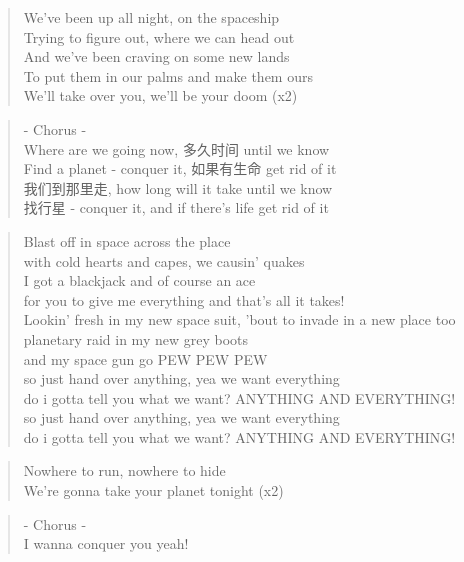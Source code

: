 {}
\begin{verse}
We've been up all night, on the spaceship\\
Trying to figure out, where we can head out\\
And we've been craving on some new lands\\
To put them in our palms and make them ours\\
We'll take over you, we'll be your doom (x2)
\end{verse}

\begin{verse}
- Chorus -\\
Where are we going now, 多久时间 until we know\\
Find a planet - conquer it, 如果有生命 get rid of it\\
我们到那里走, how long will it take until we know\\
找行星 - conquer it, and if there's life get rid of it
\end{verse}

\begin{verse}
Blast off in space across the place\\
with cold hearts and capes, we causin' quakes\\
I got a blackjack and of course an ace\\
for you to give me everything and that's all it takes!\\
Lookin' fresh in my new space suit, 'bout to invade in a new place too\\
planetary raid in my new grey boots\\
and my space gun go PEW PEW PEW\\
so just hand over anything, yea we want everything\\
do i gotta tell you what we want? ANYTHING AND EVERYTHING!\\
so just hand over anything, yea we want everything\\
do i gotta tell you what we want? ANYTHING AND EVERYTHING!
\end{verse}

\begin{verse}
Nowhere to run, nowhere to hide\\
We're gonna take your planet tonight (x2)
\end{verse}

\begin{verse}
- Chorus -\\
I wanna conquer you yeah!
\end{verse}


\clearpage






